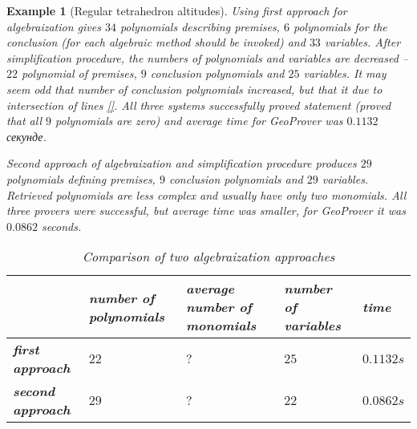 \documentclass[final,1p,times,authoryear]{elsarticle}
\newtheorem{example}[theorem]{Example}
\begin{document}
\begin{example}[Regular tetrahedron altitudes]
Using first approach for algebraization gives $34$ polynomials
describing premises, $6$ polynomials for the conclusion (for each
algebraic method should be invoked) and $33$ variables. After
simplification procedure, the numbers of polynomials and variables are
decreased -- $22$ polynomial of premises, $9$ conclusion polynomials
and $25$ variables. It may seem odd that number of conclusion
polynomials increased, but that it due to intersection of lines
\ref{}. All three systems successfully proved statement (proved that
all $9$ polynomials are zero) and average time for GeoProver was
$0.1132$ секунде.

Second approach of algebraization and simplification procedure
produces $29$ polynomials defining premises, $9$ conclusion
polynomials and $29$ variables. Retrieved polynomials are less complex
and usually have only two monomials. All three provers were
successful, but average time was smaller, for GeoProver it was
$0.0862$ seconds.

\begin{table}[!hb]
\begin{center}
\begin{tabular}{L{2cm}||R{2cm}|R{2cm}|R{2cm}|R{1.5cm}}
\                   &  number of polynomials & average number of monomials & number of variables & time \\
\hline
\hline
\textbf{first approach} & $22$ & $?$ & $25$ & $0.1132s$ \\
\hline
\textbf{second approach} & $29$ & $?$ & $22$ & $0.0862s$
\end{tabular}
\caption{Comparison of two algebraization approaches}
\end{center}
\end{table}

\end{example}
\end{document}
